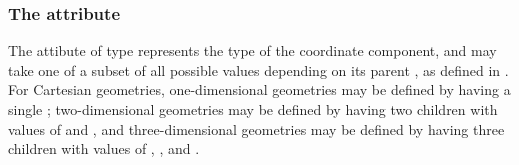 \subsubsection{The  attribute}
The  attibute of type  represents the type of the coordinate component, and may take one of a subset of all possible  values depending on its parent \Geometry, as defined in .
For Cartesian geometries, one-dimensional geometries may be defined by having a single  \CoordinateComponent; two-dimensional geometries may be defined by having two \CoordinateComponent children with  values of  and , and three-dimensional geometries may be defined by having three \CoordinateComponent children with  values of , , and .

